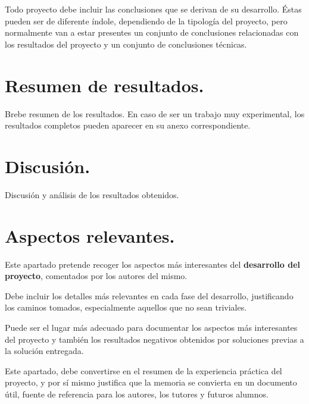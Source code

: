 
Todo proyecto debe incluir las conclusiones que se derivan de su desarrollo. Éstas pueden ser de diferente índole, dependiendo de la tipología del proyecto, pero normalmente van a estar presentes un conjunto de conclusiones relacionadas con los resultados del proyecto y un conjunto de conclusiones técnicas. 

\section{Resumen de resultados.}

Brebe resumen de los resultados. En caso de ser un trabajo muy experimental, los resultados completos pueden aparecer en su anexo correspondiente.

\section{Discusión.}

Discusión y análisis de los resultados obtenidos.


\section{Aspectos relevantes.}

Este apartado pretende recoger los aspectos más interesantes del \textbf{desarrollo del proyecto}, comentados por los autores del mismo.

Debe incluir los detalles más relevantes en cada fase del desarrollo, justificando los caminos tomados, especialmente aquellos que no sean triviales. 

Puede ser el lugar más adecuado para documentar los aspectos más interesantes del proyecto y también los resultados negativos obtenidos por soluciones previas a la solución entregada.

Este apartado, debe convertirse en el resumen de la experiencia práctica del proyecto, y por sí mismo justifica que la memoria se convierta en un documento útil, fuente de referencia para los autores, los tutores y futuros alumnos.




